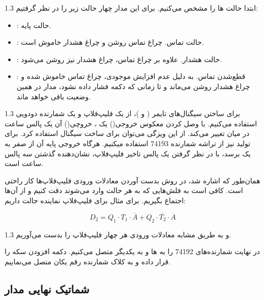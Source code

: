 \documentclass[a4paper,12pt]{article}
\numberwithin{figure}{subsection}
\begin{document}
\begin{spacing}{1.3}
ابتدا حالت ها را مشخص می‌کنیم. برای این مدار چهار حالت زیر را در نظر گرفتیم:
\end{spacing}

\begin{itemize}
\item {}: حالت پایه.
\item {}: حالت تماس. چراغ تماس روشن و چراغ هشدار خاموش است.
\item {}: حالت هشدار. علاوه بر چراغ تماس، چراغ هشدار نیز روشن می‌شود.
\item {}: قطع‌شدن تماس. به دلیل عدم افزایش موجودی، چراغ تماس خاموش شده و چراغ هشدار روشن می‌ماند و تا زمانی که دکمه  فشار داده نشود، مدار در همین وضعیت باقی خواهد ماند.
\end{itemize}

\begin{spacing}{1.3}
برای ساختن سیگنال‌های تایمر ( و )، از یک فلیپ‌فلاپ و یک شمارنده دودویی استفاده می‌کنیم. با وصل کردن معکوس خروجی() یک ، خروچی() آن یک پالس ساعت در میان تغییر می‌کند. از این ویزگی می‌توان برای ساخت سیگنال  استفاده کرد. برای تولید  نیز از تراشه شمارنده 74193 استفاده میکنیم. هرگاه خروجی پایه  آن از صفر به یک برسد، با در نظر گرفتن یک پالس تاخیر فلیپ‌فلاپ، نشان‌دهنده گذشتن سه پالس ساعت است.

همان‌طور که اشاره شد، در روش  بدست آوردن معادلات ورودی فلیپ‌فلاپ‌ها کار راحتی است. کافی است به فلش‌هایی که به هر حالت وارد می‌شوند دقت کنیم و از آن‌ها اجتماع بگیریم. برای مثال برای فلیپ‌فلاپ نماینده حالت  داریم:
\end{spacing}

$$D_2 = Q_1 \cdot T_1 \cdot \overline{A} + Q_2 \cdot \overline{T_2} \cdot \overline{A}$$


\begin{spacing}{1.3}
و به طریق مشابه معادلات ورودی هر چهار فلیپ‌فلاپ را بدست می‌آوریم.

در نهایت شمارنده‌های 74192 را به  ها و به یکدیگر متصل می‌کنیم. دکمه افزودن سکه را قرار داده و به کلاک  شمارنده رقم یکان متصل می‌نماییم.
\end{spacing}

\newpage

\subsection{شماتیک نهایی مدار}
\label{subsec:imp-detail-1}
\leavevmode\par
\vspace{0.2cm}
\end{document}
